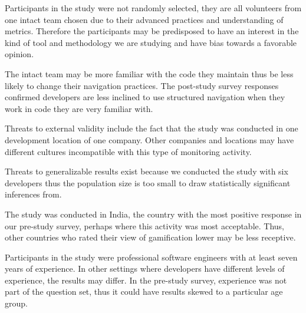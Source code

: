 \documentclass{sig-alternate}
\begin{document}
Participants in the study were not randomly selected, they are all volunteers from one intact team chosen due to their advanced practices and understanding of metrics.  Therefore the participants may be predisposed to have an interest in the kind of tool and methodology we are studying and have bias towards a favorable opinion.  

The intact team may be more familiar with the code they maintain thus be less likely to change their navigation practices.  The post-study survey responses confirmed developers are less inclined to use structured navigation when they work in code they are very familiar with.  

Threats to external validity include the fact that the study was conducted in one development location of one company.  Other companies and locations may have different cultures incompatible with this type of monitoring activity.

 Threats to generalizable results exist because we conducted the study with six developers thus the population size is too small to draw statistically significant inferences from. 

 The study was conducted in India, the country with the most positive response in our pre-study survey, perhaps where this activity was most acceptable.  Thus, other countries who rated their view of gamification lower may be less receptive. 

Participants in the study were professional software engineers with at least seven years of experience.  In other settings where developers have different levels of experience, the results may differ.  In  the pre-study survey, experience was not part of the question set, thus it could have results skewed to a particular age group.
\end{document}
